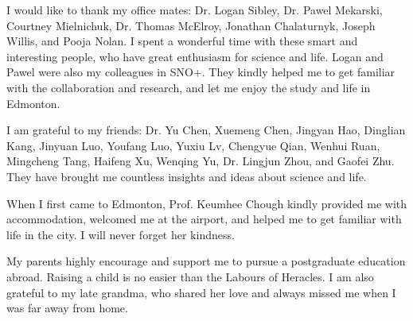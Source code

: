 I would like to thank my office mates: Dr. Logan Sibley, Dr. Pawel Mekarski, Courtney Mielnichuk, Dr. Thomas McElroy, Jonathan Chalaturnyk, Joseph Willis, and Pooja Nolan. I spent a wonderful time with these smart and interesting people, who have great enthusiasm for science and life. Logan and Pawel were also my colleagues in SNO+. They kindly helped me to get familiar with the collaboration and research, and let me enjoy the study and life in Edmonton.

I am grateful to my friends: Dr. Yu Chen, Xuemeng Chen, Jingyan Hao, Dinglian Kang, Jinyuan Luo, Youfang Luo, Yuxiu Lv, Chengyue Qian, Wenhui Ruan, Mingcheng Tang, Haifeng Xu, Wenqing Yu, Dr. Lingjun Zhou, and Gaofei Zhu. They have brought me countless insights and ideas about science and life.

When I first came to Edmonton, Prof. Keumhee Chough kindly provided me with accommodation, welcomed me at the airport, and helped me to get familiar with life in the city. I will never forget her kindness.

My parents highly encourage and support me to pursue a postgraduate education abroad. Raising a child is no easier than the Labours of Heracles. I am also grateful to my late grandma, who shared her love and always missed me when I was far away from home.
